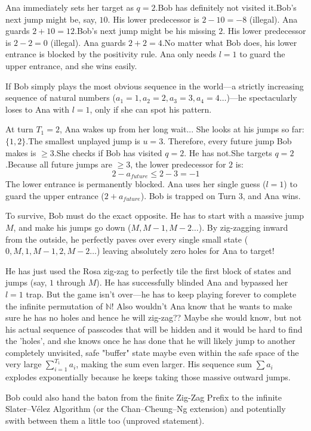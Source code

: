 Ana immediately sets her target as $q = 2$.Bob has definitely not visited it.Bob's next jump might be, say, $10$. His lower predecessor is $2 - 10 = -8$ (illegal). Ana guards $2 + 10 = 12$.Bob's next jump might be his missing $2$. His lower predecessor is $2 - 2 = 0$ (illegal). Ana guards $2 + 2 = 4$.No matter what Bob does, his lower entrance is blocked by the positivity rule. Ana only needs $l=1$ to guard the upper entrance, and she wins easily.


If Bob simply plays the most obvious sequence in the world—a strictly increasing sequence of natural numbers ($a_1=1, a_2=2, a_3=3, a_4=4 \dots$)—he spectacularly loses to Ana with $l=1$, only if she can spot his pattern.

At turn $T_1 = 2$, Ana wakes up from her long wait... She looks at his jumps so far: $\{1, 2\}$.The smallest unplayed jump is $u = 3$. Therefore, every future jump Bob makes is $\ge 3$.She checks if Bob has visited $q=2$. He has not.She targets $q=2$.Because all future jumps are $\ge 3$, the lower predecessor for $2$ is:$$2 - a_{future} \le 2 - 3 = -1$$The lower entrance is permanently blocked. Ana uses her single guess ($l=1$) to guard the upper entrance ($2 + a_{future}$). Bob is trapped on Turn 3, and Ana wins.

To survive, Bob must do the exact opposite. He has to start with a massive jump $M$, and make his jumps go down ($M, M-1, M-2 \dots$). By zig-zagging inward from the outside, he perfectly paves over every single small state ($0, M, 1, M-1, 2, M-2 \dots$) leaving absolutely zero holes for Ana to target!


He has just used the Rosa zig-zag to perfectly tile the first block of states and jumps (say, $1$ through $M$). He has successfully blinded Ana and bypassed her $l=1$ trap. But the game isn't over—he has to keep playing forever to complete the infinite permutation of $\mathbb{N}$! Also wouldn't Ana know that he wants to make sure he has no holes and hence he will zig-zag?? Maybe she would know, but not his actual sequence of passcodes that will be hidden and it would be hard to find the 'holes', and she knows once he has done that he will likely jump to another completely unvisited, safe "buffer" state maybe even within the safe space of the very large $\sum_{i=1}^{T_1} a_i$, making the sum even larger. His sequence sum $\sum a_i$ explodes exponentially because he keeps taking those massive outward jumps.

Bob could also hand the baton from the finite Zig-Zag Prefix to the infinite Slater–Vélez Algorithm (or the Chan–Cheung–Ng extension) and potentially swith between them a little too (unproved statement).


